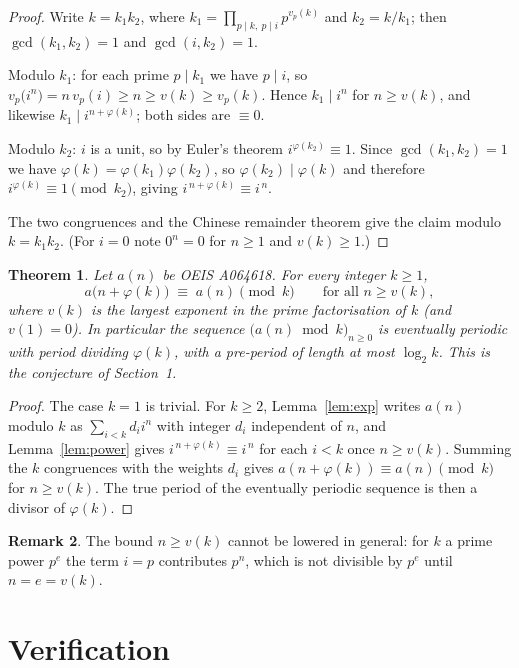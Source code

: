 \documentclass[11pt,a4paper]{article}
\theoremstyle{plain}
\newtheorem{theorem}{Theorem}
\theoremstyle{definition}
\newtheorem{remark}[theorem]{Remark}
\begin{document}
\begin{proof}
Write $k=k_1k_2$, where $k_1=\prod_{p\mid k,\ p\mid i}p^{v_p(k)}$ and $k_2=k/k_1$; then
$\gcd(k_1,k_2)=1$ and $\gcd(i,k_2)=1$.

Modulo $k_1$: for each prime $p\mid k_1$ we have $p\mid i$, so
$v_p\bigl(i^{n}\bigr)=n\,v_p(i)\ge n\ge v(k)\ge v_p(k)$. Hence $k_1\mid i^{n}$ for
$n\ge v(k)$, and likewise $k_1\mid i^{n+\varphi(k)}$; both sides are $\equiv 0$.

Modulo $k_2$: $i$ is a unit, so by Euler's theorem $i^{\varphi(k_2)}\equiv 1$. Since
$\gcd(k_1,k_2)=1$ we have $\varphi(k)=\varphi(k_1)\varphi(k_2)$, so
$\varphi(k_2)\mid\varphi(k)$ and therefore $i^{\varphi(k)}\equiv 1 \pmod{k_2}$, giving
$i^{\,n+\varphi(k)}\equiv i^{\,n}$.

The two congruences and the Chinese remainder theorem give the claim modulo $k=k_1k_2$.
(For $i=0$ note $0^{n}=0$ for $n\ge 1$ and $v(k)\ge1$.)
\end{proof}

\begin{theorem}\label{thm:main}
Let $a(n)$ be OEIS A064618. For every integer $k\ge1$,
\[
a\bigl(n+\varphi(k)\bigr)\;\equiv\;a(n)\pmod{k}\qquad\text{for all } n\ge v(k),
\]
where $v(k)$ is the largest exponent in the prime factorisation of $k$ (and $v(1)=0$).
In particular the sequence $\bigl(a(n)\bmod k\bigr)_{n\ge0}$ is eventually periodic with
period dividing $\varphi(k)$, with a pre-period of length at most $\log_2 k$. This is the
conjecture of Section~1.
\end{theorem}

\begin{proof}
The case $k=1$ is trivial. For $k\ge2$, Lemma~\ref{lem:exp} writes $a(n)$ modulo $k$ as
$\sum_{i<k}d_i i^{n}$ with integer $d_i$ independent of $n$, and Lemma~\ref{lem:power}
gives $i^{\,n+\varphi(k)}\equiv i^{\,n}$ for each $i<k$ once $n\ge v(k)$. Summing the
$k$ congruences with the weights $d_i$ gives
$a(n+\varphi(k))\equiv a(n)\pmod k$ for $n\ge v(k)$. The true period of the eventually
periodic sequence is then a divisor of $\varphi(k)$.
\end{proof}

\begin{remark}
The bound $n\ge v(k)$ cannot be lowered in general: for $k$ a prime power $p^{e}$ the
term $i=p$ contributes $p^{n}$, which is not divisible by $p^{e}$ until $n=e=v(k)$.
\end{remark}

\section{Verification}
\end{document}

